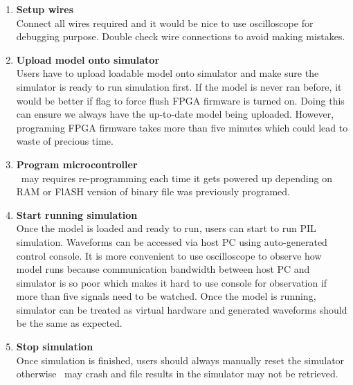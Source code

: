 \begin{enumerate}
\item \textbf{Setup wires} \\
Connect all wires required and it would be nice to use oscilloscope for debugging purpose. Double check wire connections to avoid making mistakes. 
\item \textbf{Upload model onto simulator} \\
Users have to upload loadable model onto simulator and make sure the simulator is ready to run simulation first. If the model is never ran before, it would be better if flag to force flush \gls{FPGA} firmware is turned on. Doing this can ensure we always have the up-to-date model being uploaded. However, programing \gls{FPGA} firmware takes more than five minutes which could lead to waste of precious time. 
\item \textbf{Program microcontroller} \\
\tms~may requires re-programming each time it gets powered up depending on RAM or FlASH version of binary file was previously programed. 
\item \textbf{Start running simulation} \\
Once the model is loaded and ready to run, users can start to run \gls{PIL} simulation. Waveforms can be accessed via host PC using auto-generated control console. It is more convenient to use oscilloscope to observe how model runs because communication bandwidth between host PC and simulator is so poor which makes it hard to use console for observation if more than five signals need to be watched. Once the model is running, simulator can be treated as virtual hardware and generated waveforms should be the same as expected. \\
\item \textbf{Stop simulation} \\
Once simulation is finished, users should always manually reset the simulator otherwise \rtlab~may crash and file results in the simulator may not be retrieved. 
\end{enumerate}
